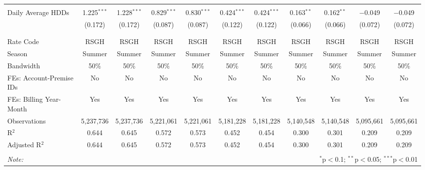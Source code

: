 \begin{table}[!htbp]
\begin{tabular}{@{\extracolsep{5pt}}lcccccccccc}
  & & & & & & & & & & \\ 
 Daily Average HDDs & 1.225$^{***}$ & 1.228$^{***}$ & 0.829$^{***}$ & 0.830$^{***}$ & 0.424$^{***}$ & 0.424$^{***}$ & 0.163$^{**}$ & 0.162$^{**}$ & $-$0.049 & $-$0.049 \\ 
  & (0.172) & (0.172) & (0.087) & (0.087) & (0.122) & (0.122) & (0.066) & (0.066) & (0.072) & (0.072) \\ 
  & & & & & & & & & & \\ 
\hline \\[-1.8ex] 
Rate Code & RSGH & RSGH & RSGH & RSGH & RSGH & RSGH & RSGH & RSGH & RSGH & RSGH \\ 
Season & Summer & Summer & Summer & Summer & Summer & Summer & Summer & Summer & Summer & Summer \\ 
Bandwidth & 50\% & 50\% & 50\% & 50\% & 50\% & 50\% & 50\% & 50\% & 50\% & 50\% \\ 
FEs: Account-Premise IDs & No & No & No & No & No & No & No & No & No & No \\ 
FEs: Billing Year-Month & Yes & Yes & Yes & Yes & Yes & Yes & Yes & Yes & Yes & Yes \\ 
Observations & 5,237,736 & 5,237,736 & 5,221,061 & 5,221,061 & 5,181,228 & 5,181,228 & 5,140,548 & 5,140,548 & 5,095,661 & 5,095,661 \\ 
R$^{2}$ & 0.644 & 0.645 & 0.572 & 0.573 & 0.452 & 0.454 & 0.300 & 0.301 & 0.209 & 0.209 \\ 
Adjusted R$^{2}$ & 0.644 & 0.645 & 0.572 & 0.573 & 0.452 & 0.454 & 0.300 & 0.301 & 0.209 & 0.209 \\ 
\hline 
\hline \\[-1.8ex] 
\textit{Note:}  & \multicolumn{10}{r}{$^{*}$p$<$0.1; $^{**}$p$<$0.05; $^{***}$p$<$0.01} \\ 
\end{tabular} 
\end{table} 
